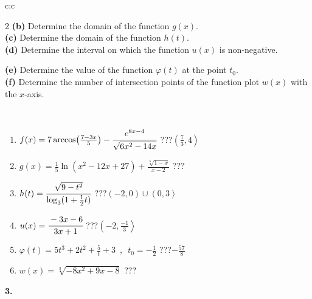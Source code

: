 \documentclass[10pt]{report}
\begin{document}
\begin{tabular}{c:c}
\begin{minipage}[c][104.5mm][t]{0.5\linewidth}
\begin{center}
\begin{minipage}{0.95\linewidth}
\begin{center}
{\begin{multicols}{2}
\textbf{(b)} Determine the domain of the function \(g(x)\). \\[1mm]
\textbf{(c)} Determine the domain of the function \(h(t)\). \\[1mm]
\textbf{(d)} Determine the interval on which the function \(u(x)\) is non-negative. \par \columnbreak
\textbf{(e)} Determine the value of the function \(\varphi(t)\) at the point \(t_0\). \\[1mm]
\textbf{(f)} Determine the number of intersection points of the function plot \(w(x)\) with the \(x\)-axis. \\[1mm]
\end{multicols}
}
\end{center}
\end{minipage}
\\[4mm]
\begin{minipage}{0.79\linewidth}
\begin{center}
\begin{varwidth}{\linewidth}
\begin{enumerate}
\small
\item $f(x) = 7\arccos\!\left( \frac{7-3x}{5} \right) - \cfrac{e^{8x-4}}{\sqrt{6x^2-14x}}$\quad \dotfill\; ???\;\dotfill \quad $\left(\frac{7}{3} , 4\right\rangle$
\item $g(x) = \frac{1}{5} \ln{\!(x^2-12x+27)}+\frac{\sqrt[3]{1-x}}{x-2}$\quad \dotfill\; ???\;\dotfill {}
\item $h(t) = \cfrac{\sqrt{9-t^2}}{\log_3(1+\frac{1}{2}t)}$\quad \dotfill\; ???\;\dotfill \quad $\left(-2 , 0\right)\cup\left(0 , 3\right\rangle$
\item $u(x) = \cfrac{-3x-6}{3x+1}$\quad \dotfill\; ???\;\dotfill \quad $\left(-2 , \frac{-1}{3}\right\rangle$
\item $\varphi(t) = 5t^3+2t^2+\frac{5}{t}+3 \enspace , \enspace t_0=-\frac{1}{2}$\quad \dotfill\; ???\;\dotfill \quad $-\frac{57}{8}$
\item $w(x) = \sqrt[3]{-8x^2+9x-8}$\quad \dotfill\; ???\;\dotfill {}
\end{enumerate}
\end{varwidth}
\end{center}
\end{minipage}
\begin{minipage}{0.20\linewidth}
\begin{center}
{\Huge\bfseries 3.} \\[2mm]

\end{center}
\end{minipage}
\end{center}
\end{minipage}
\end{tabular}
\end{document}
